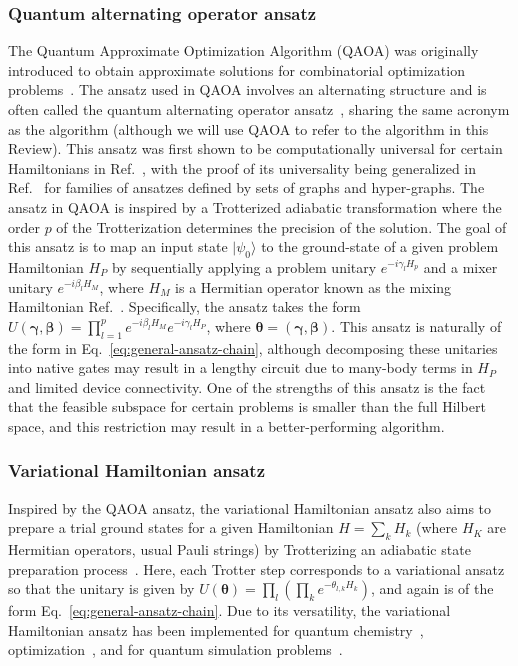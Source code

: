 \documentclass[prx,twocolumn,floatfix,superscriptaddress,longbibliography]{revtex4-1}
\renewcommand{\vec}[1]{\boldsymbol{#1}}  %
\newcommand{\<}{\langle}
\renewcommand{\>}{\rangle}
\newcommand{\ket}[1]{|#1\rangle}               %
\renewcommand{\vec}[1]{\boldsymbol{#1}}  %
\begin{document}
     

\subsubsection{Quantum alternating operator ansatz} The Quantum Approximate Optimization Algorithm (QAOA) was originally introduced to obtain approximate solutions for combinatorial optimization problems~\cite{qaoa2014}. The ansatz used in QAOA involves an alternating structure and is often called the quantum alternating operator ansatz~\cite{nasaQAOA2019}, sharing the same acronym as the algorithm (although we will use QAOA to refer to the algorithm in this Review). This ansatz was first shown to be computationally universal for certain Hamiltonians in Ref.~\cite{Lloyd_2018}, with the proof of its universality being generalized in Ref.~\cite{morales2020universality} for families  of ansatzes defined by sets of graphs and hyper-graphs.   The ansatz in QAOA is inspired by a Trotterized adiabatic transformation where the order $p$ of the Trotterization determines the precision of the solution. The goal of this ansatz is to map an input state $\ket{\psi_0}$ to the ground-state of a given problem Hamiltonian $H_P$ by  sequentially applying a problem unitary $e^{-i \gamma_l H_p}$ and a mixer unitary $e^{-i \beta_l H_M}$, where $H_M$ is a Hermitian operator known as the mixing Hamiltonian Ref.~\cite{wang2020x}. Specifically, the ansatz takes the form $U(\vec{\gamma},\vec{\beta})=\prod_{l=1}^p e^{-i \beta_l H_M}e^{-i \gamma_l H_P}$, where $\vec{\theta}=(\vec{\gamma},\vec{\beta})$. This ansatz is naturally of the form in Eq.~\eqref{eq:general-ansatz-chain}, although decomposing these unitaries into native gates may result in a lengthy circuit due to many-body terms in $H_P$ and limited device connectivity. One of the strengths of this ansatz is the fact that the feasible subspace for certain problems is smaller than the full Hilbert space, and this restriction may result in a better-performing algorithm. 


\subsubsection{Variational Hamiltonian ansatz}  Inspired by the QAOA ansatz, the variational Hamiltonian ansatz also aims to prepare a trial ground states for a given Hamiltonian $H=\sum_k H_k$ (where $H_K$ are Hermitian operators, usual Pauli strings) by Trotterizing an adiabatic state preparation process~\cite{wecker2015progress}. Here, each Trotter step corresponds to a variational ansatz so that  the unitary is given by $U(\vec{\theta})=\prod_l(\prod_k e^{-\theta_{l,k}H_k})$, and again is of the form Eq.~\eqref{eq:general-ansatz-chain}. Due to its versatility, the variational Hamiltonian ansatz has been  implemented for quantum chemistry~\cite{kivlichan2018quantum,wiersema2020exploring}, optimization~\cite{nasaQAOA2019}, and for quantum simulation problems~\cite{ho2019efficient}.
\end{document}
